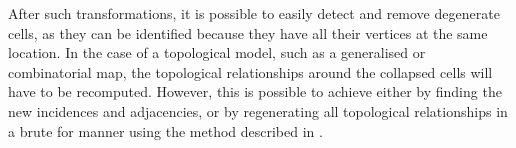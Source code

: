 
After such transformations, it is possible to easily detect and remove degenerate cells, as they can be identified because they have all their vertices at the same location.
In the case of a topological model, such as a generalised or combinatorial map, the topological relationships around the collapsed cells will have to be recomputed.
However, this is possible to achieve either by finding the new incidences and adjacencies, or by regenerating all topological relationships in a brute for manner using the method described in .


